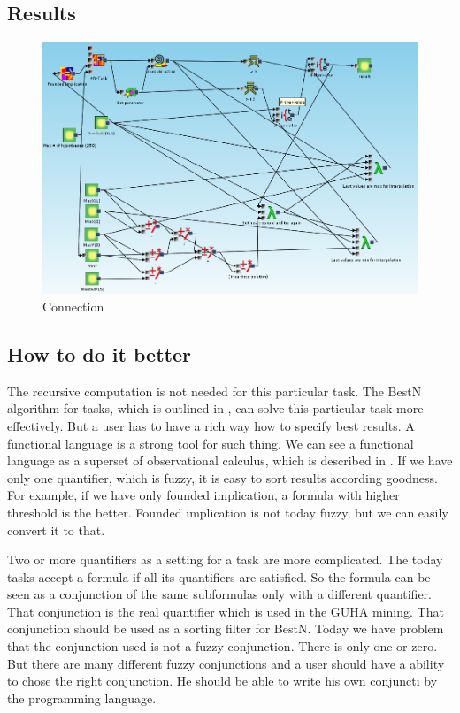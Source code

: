 \documentclass[a4paper,12pt]{book}
\begin{document}
\subsection{Results}
\begin{figure}
	\includegraphics[width=13.72cm]{exampleResult}
	\caption{Connection}
\end{figure}


\subsection{How to do it better}
The recursive computation is not needed for this particular task. The BestN algorithm for tasks, which is outlined in \cite{thesisKuchar}, can solve this particular task more effectively. But a user has to have a rich way how to specify best results. A functional language is a strong tool for such thing. We can see a functional language as a superset of observational calculus, which is described in \cite{GUHAbook}. If we have only one quantifier, which is fuzzy, it is easy to sort results according goodness. For example, if we have only founded implication, a formula with higher threshold is the better. Founded implication is not today fuzzy, but we can easily convert it to that.

Two or more quantifiers as a setting for a task are more complicated. The today tasks accept a formula if all its quantifiers are satisfied. So the formula can be seen as a conjunction of the same subformulas only with a different quantifier. That conjunction is the real quantifier which is used in the GUHA mining. That conjunction should be used as a sorting filter for BestN. Today we have problem that the conjunction used is not a fuzzy conjunction. There is only one or zero. But there are many different fuzzy conjunctions and a user should have a ability to chose the right conjunction. He should be able to write his own conjuncti by the programming language.
\end{document}
